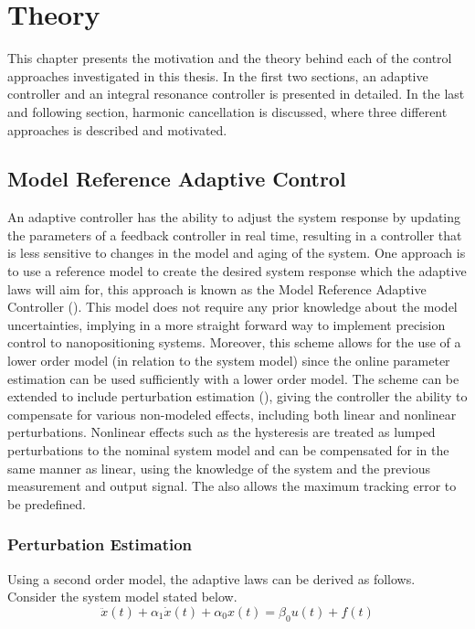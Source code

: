 \chapter{Theory}\label{cha:controlApproach}
This chapter presents the motivation and the theory behind each of the control approaches investigated in this thesis. In the first two sections, an adaptive controller and an integral resonance controller is presented in detailed. In the last and following section, harmonic cancellation is discussed, where three different approaches is described and motivated.

\section{Model Reference Adaptive Control}
An adaptive controller has the ability to adjust the system response by updating the parameters of a feedback controller in real time, resulting in a controller that is less sensitive to changes in the model and aging of the system. One approach is to use a reference model to create the desired system response which the adaptive laws will aim for, this approach is known as the Model Reference Adaptive Controller (\abbrMRAC). This model does not require any prior knowledge about the model uncertainties, implying in a more straight forward way to implement precision control to nanopositioning systems. Moreover, this scheme allows for the use of a lower order model (in relation to the system model) since the online parameter estimation can be used sufficiently with a lower order model. The \abbrMRAC scheme can be extended to include perturbation estimation (\abbrMRACPE), giving the controller the ability to compensate for various non-modeled effects, including both linear and nonlinear perturbations. Nonlinear effects such as the hysteresis are treated as lumped perturbations to the nominal system model and can be compensated for in the same manner as linear, using the knowledge of the system and the previous measurement and output signal. The \abbrMRACPE also allows the maximum tracking error to be predefined.

\subsection{Perturbation Estimation}\label{sec:pertest}
Using a second order model, the adaptive laws can be derived as follows. Consider the system model stated below.
\begin{equation}
  \label{eq:sysmodel}
  \ddot{x}(t) + \alpha_1\dot{x}(t) +  \alpha_0x(t) = \beta_0u(t) + f(t)
\end{equation}


